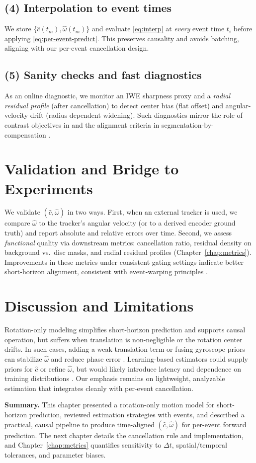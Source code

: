 \subsection*{(4) Interpolation to event times}
We store $\{\hat c(t_m),\hat\omega(t_m)\}$ and evaluate \eqref{eq:interp} at \emph{every} event time $t_i$ before applying \eqref{eq:per-event-predict}. This preserves causality and avoids batching, aligning with our per-event cancellation design.

\subsection*{(5) Sanity checks and fast diagnostics}
As an online diagnostic, we monitor an IWE sharpness proxy and a \emph{radial residual profile} (after cancellation) to detect center bias (flat offset) and angular-velocity drift (radius-dependent widening). Such diagnostics mirror the role of contrast objectives in \cite{Gallego2018CMax} and the alignment criteria in segmentation-by-compensation \cite{Stoffregen2019Segmentation}.

\section{Validation and Bridge to Experiments}
We validate $(\hat c,\hat\omega)$ in two ways. First, when an external tracker is used, we compare $\hat\omega$ to the tracker's angular velocity (or to a derived encoder ground truth) and report absolute and relative errors over time. Second, we assess \emph{functional} quality via downstream metrics: cancellation ratio, residual density on background vs.\ disc masks, and radial residual profiles (Chapter~\ref{chap:metrics}). Improvements in these metrics under consistent gating settings indicate better short-horizon alignment, consistent with event-warping principles \cite{Gallego2018CMax}.

\section{Discussion and Limitations}
Rotation-only modeling simplifies short-horizon prediction and supports causal operation, but suffers when translation is non-negligible or the rotation center drifts. In such cases, adding a weak translation term or fusing gyroscope priors can stabilize $\hat\omega$ and reduce phase error \cite{Rebecq2017EVO}. Learning-based estimators could supply priors for $\hat c$ or refine $\hat\omega$, but would likely introduce latency and dependence on training distributions \cite{Zhu2018FlowNet,Zhu2019Unsupervised}. Our emphasis remains on lightweight, analyzable estimation that integrates cleanly with per-event cancellation.

\medskip
\noindent\textbf{Summary.} This chapter presented a rotation-only motion model for short-horizon prediction, reviewed estimation strategies with events, and described a practical, causal pipeline to produce time-aligned $(\hat c,\hat\omega)$ for per-event forward prediction. The next chapter details the cancellation rule and implementation, and Chapter~\ref{chap:metrics} quantifies sensitivity to $\Delta t$, spatial/temporal tolerances, and parameter biases.
